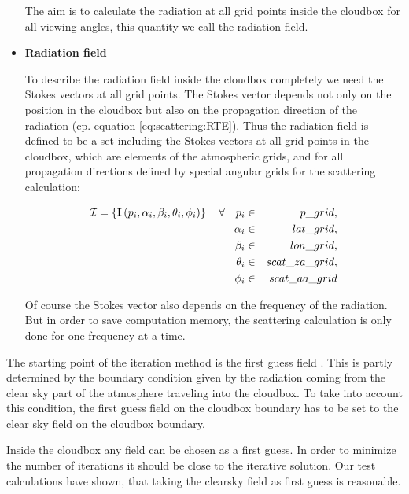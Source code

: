\begin{itemize}
The aim is to calculate the radiation at all grid points inside the
cloudbox for all viewing angles, this quantity we call the radiation
field.

\item{\bf Radiation field}
  
  To describe the radiation field inside the cloudbox completely we
  need the Stokes vectors at all grid points. The Stokes vector
  depends not only on the position in the cloudbox but also on the
  propagation direction of the radiation (cp. equation
  \ref{eq:scattering:RTE}). Thus the radiation field is defined to be
  a set including the Stokes vectors at all grid points in the
  cloudbox, which are elements of the atmospheric grids, and for all
  propagation directions defined by special angular grids for the
  scattering calculation:

\begin{eqnarray}
{\mathcal I} = \left\{ {\bf I} \left( p_i, \alpha_i, \beta_i, \theta_i, \phi_i\right)\right\}   \quad
\forall \quad p_i &\in& p\_grid,\\
 \alpha_i &\in& lat\_grid, \\
 \beta_i &\in& lon\_grid, \\
 \theta_i &\in& scat\_za\_grid, \\
 \phi_i &\in& scat\_aa\_grid 
\end{eqnarray}

Of course the Stokes vector also depends on the frequency of the
radiation. But in order to save computation memory, the scattering
calculation is only done for one frequency at a time.

\end{itemize}



The starting point of the iteration method is the first guess field
. This is partly determined by the boundary condition given
by the radiation coming from the clear sky part of the atmosphere
traveling into the cloudbox. To take into account this condition, the
first guess field on the cloudbox boundary has to be set to the clear
sky field on the cloudbox boundary.

Inside the cloudbox any field can be chosen as a first guess. In order
to minimize the number of iterations it should be close to the
iterative solution. Our test calculations have shown, that taking the
clearsky field as first guess is reasonable.


